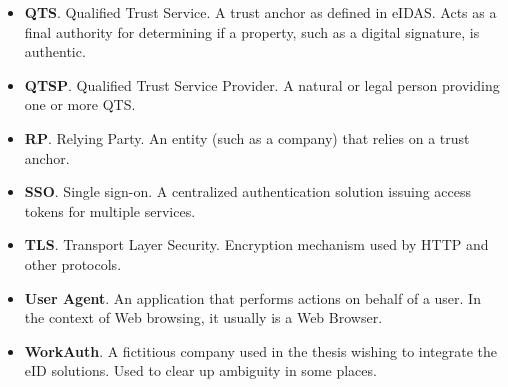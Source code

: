 \begin{itemize}
    \item \textbf{QTS}. Qualified Trust Service. A trust anchor as defined in eIDAS. Acts as a final authority for determining if a property, such as a digital signature, is authentic.
    \item \textbf{QTSP}. Qualified Trust Service Provider. A natural or legal person providing one or more QTS.
    \item \textbf{RP}. Relying Party. An entity (such as a company) that relies on a trust anchor.
    \item \textbf{SSO}. Single sign-on. A centralized authentication solution issuing access tokens for multiple services.
    \item \textbf{TLS}. Transport Layer Security. Encryption mechanism used by HTTP and other protocols.
    \item \textbf{User Agent}. An application that performs actions on behalf of a user. In the context of Web browsing, it usually is a Web Browser.
    \item \textbf{WorkAuth}. A fictitious company used in the thesis wishing to integrate the eID solutions. Used to clear up ambiguity in some places.
\end{itemize}